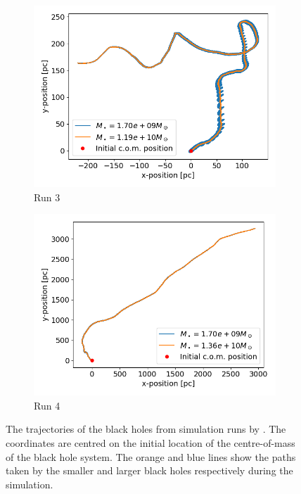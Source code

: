 \documentclass[english, oneside]{HYgradu}
\begin{document}
\begin{figure}
\begin{subfigure}[b]{0.49\textwidth}
		\includegraphics[width=\textwidth]{Run3_Trajectory_small.png}
		\caption{Run 3}
	\end{subfigure}
	\begin{subfigure}[b]{0.49\textwidth}
		\includegraphics[width=\textwidth]{Run4_Trajectory_small.png}
		\caption{Run 4}
	\end{subfigure}
	\caption{The trajectories of the black holes from simulation runs by \cite{Mannerkoski2019}. The coordinates are centred on the initial location of the centre-of-mass of the black hole system. The orange and blue lines show the paths taken by the smaller and larger black holes respectively during the simulation.}
	\label{figure:all_traj}
\end{figure}
\end{document}
